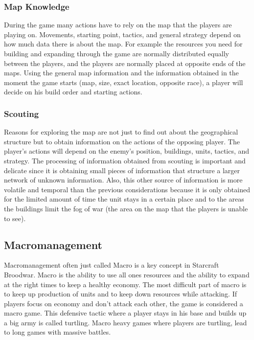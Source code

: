 			\subsubsection{Map Knowledge}
				During the game many actions have to rely on the map that the players are playing on. Movements, starting point, 
				tactics, and general strategy depend on how much data there is about the map. 				
				For example the resources you need for building and expanding through the game are normally distributed
				equally between the players, and the players are normally placed at opposite ends of the maps. 
				Using the general map information and the information obtained in the moment the game starts 
				(map, size, exact location, opposite race), a player will decide on his build order and starting actions. 
		
			\subsubsection{Scouting}
				Reasons for exploring the map are not just to find out about the geographical structure 
				but to obtain information on the actions of the opposing player. The player's actions will depend on
				the enemy's position, buildings, units, tactics, and strategy. The processing of information 
				obtained from scouting is important and delicate since it is obtaining small pieces of information 
				that structure a larger network of unknown information. Also, this other source of information 
				is more volatile and temporal than the previous considerations because it is only obtained for the 
				limited amount of time the unit stays in a certain place and to the areas the buildings limit the fog of war (the area on the map that the players is unable to see).
				
	\subsection{Macromanagement}
		Macromanagement often just called Macro is a key concept in Starcraft Broodwar. 
		Macro is the ability to use all ones resources and the ability to expand at the right times to keep a healthy economy.
		The most difficult part of macro is to keep up production of units and to keep down resources while attacking.
		If players focus on economy and don't attack each other, the game is considered a macro game. This defensive tactic where a
		player stays in his base and builds up a big army is called turtling. Macro heavy games where players are turtling, lead to
		long games with massive battles. 
			
